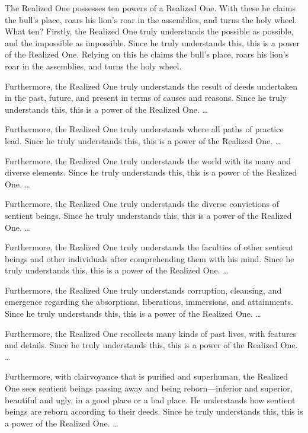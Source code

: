 \documentclass[12pt,openany]{book}%
\begin{document}
The Realized One possesses ten powers of a Realized One. With these he claims the bull’s place, roars his lion’s roar in the assemblies, and turns the holy wheel. What ten? Firstly, the Realized One truly understands the possible as possible, and the impossible as impossible. Since he truly understands this, this is a power of the Realized One. Relying on this he claims the bull’s place, roars his lion’s roar in the assemblies, and turns the holy wheel. 

Furthermore, the Realized One truly understands the result of deeds undertaken in the past, future, and present in terms of causes and reasons. Since he truly understands this, this is a power of the Realized One. … 

Furthermore, the Realized One truly understands where all paths of practice lead. Since he truly understands this, this is a power of the Realized One. … 

Furthermore, the Realized One truly understands the world with its many and diverse elements. Since he truly understands this, this is a power of the Realized One. … 

Furthermore, the Realized One truly understands the diverse convictions of sentient beings. Since he truly understands this, this is a power of the Realized One. … 

Furthermore, the Realized One truly understands the faculties of other sentient beings and other individuals after comprehending them with his mind. Since he truly understands this, this is a power of the Realized One. … 

Furthermore, the Realized One truly understands corruption, cleansing, and emergence regarding the absorptions, liberations, immersions, and attainments. Since he truly understands this, this is a power of the Realized One. … 

Furthermore, the Realized One recollects many kinds of past lives, with features and details. Since he truly understands this, this is a power of the Realized One. … 

Furthermore, with clairvoyance that is purified and superhuman, the Realized One sees sentient beings passing away and being reborn—inferior and superior, beautiful and ugly, in a good place or a bad place. He understands how sentient beings are reborn according to their deeds. Since he truly understands this, this is a power of the Realized One. … 
\end{document}
